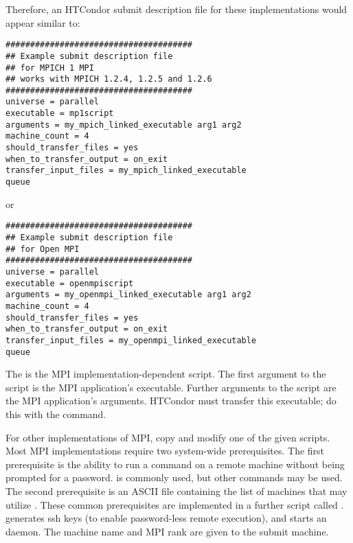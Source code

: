 Therefore, an HTCondor submit description file for these
implementations would appear similar to:

\begin{verbatim}
######################################
## Example submit description file
## for MPICH 1 MPI
## works with MPICH 1.2.4, 1.2.5 and 1.2.6
######################################
universe = parallel
executable = mp1script
arguments = my_mpich_linked_executable arg1 arg2
machine_count = 4
should_transfer_files = yes
when_to_transfer_output = on_exit
transfer_input_files = my_mpich_linked_executable
queue
\end{verbatim}

or

\begin{verbatim}
######################################
## Example submit description file
## for Open MPI
######################################
universe = parallel
executable = openmpiscript
arguments = my_openmpi_linked_executable arg1 arg2
machine_count = 4
should_transfer_files = yes
when_to_transfer_output = on_exit
transfer_input_files = my_openmpi_linked_executable
queue
\end{verbatim}

The  is the MPI implementation-dependent script.
The first argument to the script is the MPI application's 
executable.
Further arguments to the script are the MPI application's arguments.
HTCondor must transfer this executable;
do this with the  command.

For other implementations of MPI,
copy and modify one of the given scripts.
Most MPI implementations require two system-wide prerequisites.
The first prerequisite is the ability to run a command
on a remote machine without being prompted for a password.
 is commonly used, but other
commands may be used.
The second prerequisite is an ASCII file containing the
list of machines that may utilize .
These common prerequisites are implemented in a further script
called .
 generates ssh keys 
(to enable password-less remote execution),
and starts an  daemon.
The machine name and MPI rank are given to the submit machine.

